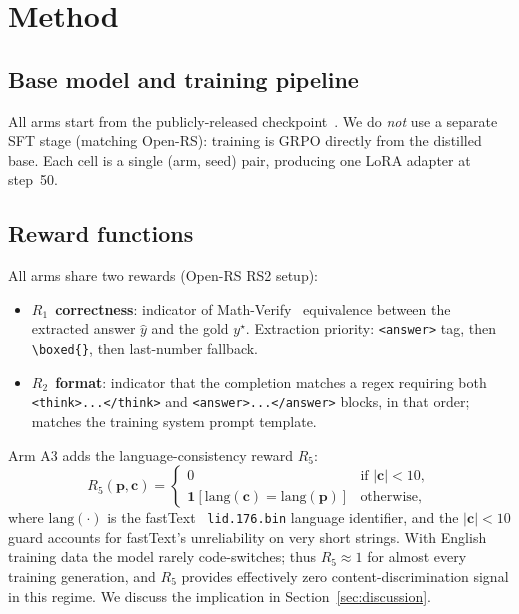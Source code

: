 \documentclass[11pt]{article}
\newcommand{\armC}{\textsc{A3}}
\newcommand{\R}[1]{R_{#1}}
\begin{document}
\section{Method}
\label{sec:method}

\subsection{Base model and training pipeline}
All arms start from the publicly-released
checkpoint~\cite{deepseekR1_2025}. We do \emph{not} use a separate SFT
stage (matching Open-RS): training is GRPO directly from the distilled
base. Each cell is a single (arm, seed) pair, producing one LoRA adapter
at step~50.

\subsection{Reward functions}
\label{sec:rewards}
All arms share two rewards (Open-RS RS2 setup):
\begin{itemize}\itemsep0pt
\item $\R{1}$~\textbf{correctness}: indicator of
Math-Verify~\cite{mathverify_2024} equivalence between the extracted
answer $\hat{y}$ and the gold $y^\star$. Extraction priority:
\texttt{<answer>} tag, then \texttt{\textbackslash boxed\{\}}, then
last-number fallback.
\item $\R{2}$~\textbf{format}: indicator that the completion matches a
regex requiring both \texttt{<think>...</think>} and
\texttt{<answer>...</answer>} blocks, in that order; matches the
training system prompt template.
\end{itemize}
Arm \armC{} adds the language-consistency reward $\R{5}$:
\begin{equation}
\R{5}(\mathbf{p},\mathbf{c}) =
\begin{cases}
0 & \text{if } |\mathbf{c}| < 10,\\[2pt]
\mathbf{1}[\mathrm{lang}(\mathbf{c}) = \mathrm{lang}(\mathbf{p})]
                & \text{otherwise,}
\end{cases}
\label{eq:r5}
\end{equation}
where $\mathrm{lang}(\cdot)$ is the fastText~\cite{joulin2017fasttext}
\texttt{lid.176.bin} language identifier, and the $|\mathbf{c}|{<}10$
guard accounts for fastText's unreliability on very short strings. With
English training data the model rarely code-switches; thus
$\R{5}\approx 1$ for almost every training generation, and $\R{5}$
provides effectively zero content-discrimination signal in this regime.
We discuss the implication in Section~\ref{sec:discussion}.
\end{document}
